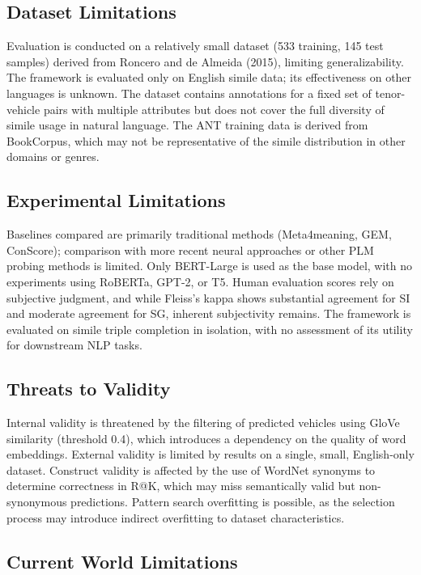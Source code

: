 \documentclass[12pt]{article}
\begin{document}
\subsection{Dataset Limitations}

Evaluation is conducted on a relatively small dataset (533 training, 145 test samples) derived from Roncero and de Almeida (2015), limiting generalizability. The framework is evaluated only on English simile data; its effectiveness on other languages is unknown. The dataset contains annotations for a fixed set of tenor-vehicle pairs with multiple attributes but does not cover the full diversity of simile usage in natural language. The ANT training data is derived from BookCorpus, which may not be representative of the simile distribution in other domains or genres.

\subsection{Experimental Limitations}

Baselines compared are primarily traditional methods (Meta4meaning, GEM, ConScore); comparison with more recent neural approaches or other PLM probing methods is limited. Only BERT-Large is used as the base model, with no experiments using RoBERTa, GPT-2, or T5. Human evaluation scores rely on subjective judgment, and while Fleiss's kappa shows substantial agreement for SI and moderate agreement for SG, inherent subjectivity remains. The framework is evaluated on simile triple completion in isolation, with no assessment of its utility for downstream NLP tasks.

\subsection{Threats to Validity}

Internal validity is threatened by the filtering of predicted vehicles using GloVe similarity (threshold 0.4), which introduces a dependency on the quality of word embeddings. External validity is limited by results on a single, small, English-only dataset. Construct validity is affected by the use of WordNet synonyms to determine correctness in R@K, which may miss semantically valid but non-synonymous predictions. Pattern search overfitting is possible, as the selection process may introduce indirect overfitting to dataset characteristics.

\subsection{Current World Limitations}
\end{document}
